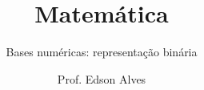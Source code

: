 \title{Matemática}
\subtitle{Bases numéricas: representação binária}
\date{}
\author{Prof. Edson Alves}
